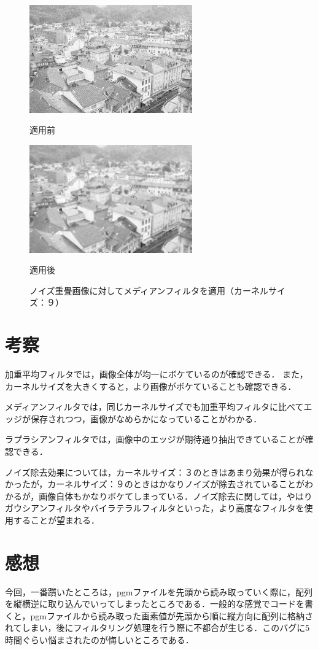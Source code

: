 \documentclass{jsarticle}
\begin{document}
\begin{figure}[htbp]
 \begin{minipage}{0.5\hsize}
  \begin{center}
   \includegraphics[width=70mm]{town_noise.png}
  \end{center}
  \caption{適用前}
  \label{fig:one}
 \end{minipage}
 \begin{minipage}{0.5\hsize}
  \begin{center}
   \includegraphics[width=70mm]{output_median_noise_9.png}
  \end{center}
  \caption{適用後}
  \label{fig:two}
 \end{minipage}
 \caption{ノイズ重畳画像に対してメディアンフィルタを適用（カーネルサイズ：９）}
\end{figure}

\section{考察}

加重平均フィルタでは，画像全体が均一にボケているのが確認できる．
また，カーネルサイズを大きくすると，より画像がボケていることも確認できる．

メディアンフィルタでは，同じカーネルサイズでも加重平均フィルタに比べてエッジが保存されつつ，画像がなめらかになっていることがわかる．

ラプラシアンフィルタでは，画像中のエッジが期待通り抽出できていることが確認できる．

ノイズ除去効果については，カーネルサイズ：３のときはあまり効果が得られなかったが，カーネルサイズ：９のときはかなりノイズが除去されていることがわかるが，画像自体もかなりボケてしまっている．ノイズ除去に関しては，やはりガウシアンフィルタやバイラテラルフィルタといった，より高度なフィルタを使用することが望まれる．

\section{感想}
今回，一番躓いたところは，pgmファイルを先頭から読み取っていく際に，配列を縦横逆に取り込んでいってしまったところである．一般的な感覚でコードを書くと，pgmファイルから読み取った画素値が先頭から順に縦方向に配列に格納されてしまい，後にフィルタリング処理を行う際に不都合が生じる．このバグに5時間ぐらい悩まされたのが悔しいところである．\\
\end{document}
